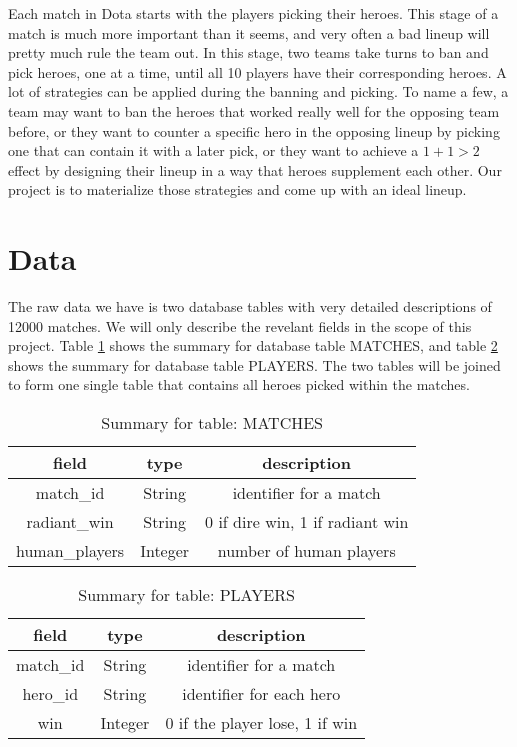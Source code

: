 \documentclass[11pt]{article}
\begin{document}
\noindent Each match in Dota starts with the players picking their heroes. This stage of a match is much more important than it seems, and very often a bad lineup will pretty much rule the team out. In this stage, two teams take turns to ban and pick heroes, one at a time, until all 10 players have their corresponding heroes. A lot of strategies can be applied during the banning and picking. To name a few, a team may want to ban the heroes that worked really well for the opposing team before, or they want to counter a specific hero in the opposing lineup by picking one that can contain it with a later pick, or they want to achieve a $1+1>2$ effect by designing their lineup in a way that heroes supplement each other. Our project is to materialize those strategies and come up with an ideal lineup.

\section{Data}
The raw data we have is two database tables with very detailed descriptions of 12000 matches. We will only describe the revelant fields in the scope of this project. Table \ref{matches} shows the summary for database table MATCHES, and table \ref{players} shows the summary for database table PLAYERS. The two tables will be joined to form one single table that contains all heroes picked within the matches.

\begin{table}[h]
  \begin{center}
	\begin{tabular}{| c | c | c |}\hline
		field & type & description \\\hline
		match\_id & String & identifier for a match \\\hline
		radiant\_win & String & 0 if dire win, 1 if radiant win \\\hline
		human\_players & Integer & number of human players \\\hline
	\end{tabular}
	\caption{Summary for table: MATCHES}\label{matches}
  \end{center}
\end{table}

\begin{table}[h]
	\begin{center}
		\begin{tabular}{| c | c | c |}\hline
			field & type & description \\\hline
			match\_id & String & identifier for a match \\\hline
			hero\_id & String & identifier for each hero \\\hline
			win & Integer & 0 if the player lose, 1 if win \\\hline
		\end{tabular}
		\caption{Summary for table: PLAYERS}\label{players}
	\end{center}
\end{table}
\end{document}
